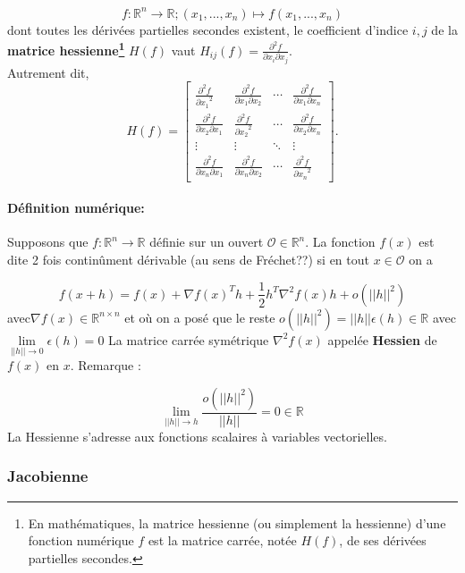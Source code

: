 	$${ f:\mathbb{R}^{n}\to \mathbb {R} ;(x_{1},...,x_{n})\mapsto f(x_{1},...,x_{n})}$$
	dont toutes les dérivées partielles secondes existent, le coefficient d'indice ${ i,j}$ de la \textbf{matrice hessienne\footnote{En mathématiques, la matrice hessienne (ou simplement la hessienne) d'une fonction numérique $f$ est la matrice carrée, notée $H(f)$, de ses dérivées partielles secondes.}} ${H(f)}$ vaut ${H_{ij}(f)={\frac {\partial ^{2}f}{\partial x_{i}\partial x_{j}}}}$.\\
	Autrement dit,
	$$
	{ H(f)={
		\begin{bmatrix}{
			\frac {\partial ^{2}f}{{\partial x_{1}}^{2}}}&{\frac {\partial ^{2}f}{\partial x_{1}\partial x_{2}}}&\cdots &{\frac {\partial ^{2}f}{\partial x_{1}\partial x_{n}}}\\
			{\frac {\partial ^{2}f}{\partial x_{2}\partial x_{1}}}&{\frac {\partial ^{2}f}{{\partial x_{2}}^{2}}}&\cdots &{\frac {\partial ^{2}f}{\partial x_{2}\partial x_{n}}}\\
			\vdots &\vdots &\ddots &\vdots \\
			{\frac {\partial ^{2}f}{\partial x_{n}\partial x_{1}}}&{\frac {\partial ^{2}f}{\partial x_{n}\partial x_{2}}}&\cdots &{\frac {\partial ^{2}f}{{\partial x_{n}}^{2}}}
		\end{bmatrix}}} .
	$$
	
	\paragraph*{Définition numérique:}
	Supposons que $f : \mathbb{R}^{n} \to \mathbb{R}$ définie sur un ouvert $\mathcal{O} \in \mathbb{R}^{n}$. La fonction $f(x)$ est dite 2
	fois continûment dérivable (au sens de Fréchet??) si en tout $x \in \mathcal{O}$ on a
	
	\begin{equation}
		f(x + h) = f(x)+\nabla f(x)^Th + \frac{1}{2}h^T\nabla^2f(x)h+o(||h||^2)
	\end{equation}
	avec$\nabla f(x)\in \mathbb{R}^{n\times n}$ et où on a posé que le reste 
	$ o(||h||^2) =||h|| \epsilon(h) \in \mathbb{R} $ avec 
	$\lim\limits_{||h|| \to 0} \epsilon(h) = 0 $
	La matrice carrée symétrique $\nabla^2 f(x)$ appelée \textbf{Hessien} de $f(x)$ en $x$. Remarque :
	
	$$
		\lim\limits_{||h|| \to h} \frac{o(||h||^2)}{||h||} = 0  \in \mathbb{R}
	$$
	La Hessienne s’adresse aux fonctions scalaires à variables vectorielles.
			
	\subsubsection{Jacobienne}
